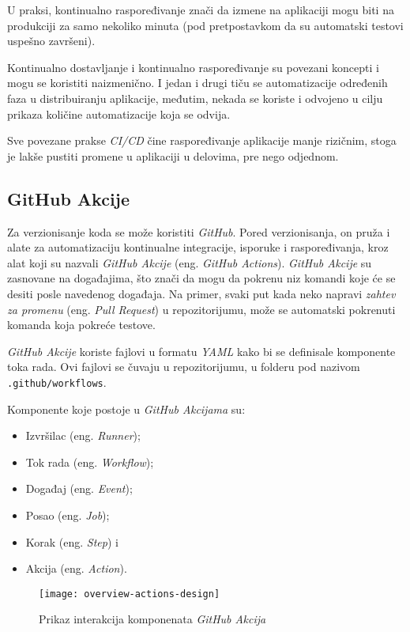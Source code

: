 U praksi, kontinualno raspoređivanje znači da izmene na aplikaciji mogu biti na produkciji za samo 
nekoliko minuta (pod pretpostavkom da su automatski testovi uspešno završeni).

Kontinualno dostavljanje i kontinualno raspoređivanje su povezani koncepti i mogu se koristiti naizmenično. 
I jedan i drugi tiču se automatizacije određenih faza u distribuiranju aplikacije, 
međutim, nekada se koriste i odvojeno u cilju prikaza količine automatizacije koja se odvija.

Sve povezane prakse \textit{CI/CD} čine raspoređivanje aplikacije manje rizičnim, stoga je lakše pustiti 
promene u aplikaciji u delovima, pre nego odjednom.~\cite{CI_CD}

\subsection{GitHub Akcije}
Za verzionisanje koda se može koristiti \textit{GitHub}. Pored verzionisanja, on pruža i alate za automatizaciju 
kontinualne integracije, isporuke i raspoređivanja, kroz alat koji su nazvali \textit{GitHub Akcije} 
(eng. \textit{GitHub Actions}). 
\textit{GitHub Akcije} su zasnovane na događajima, što znači da mogu da pokrenu niz komandi koje će se desiti 
posle navedenog događaja. Na primer, svaki put kada neko napravi \textit{zahtev za promenu} 
(eng. \textit{Pull Request}) u repozitorijumu, može se automatski pokrenuti komanda koja pokreće 
testove. 

\textit{GitHub Akcije} koriste fajlovi u formatu \textit{YAML} kako bi se definisale komponente toka rada. Ovi fajlovi 
se čuvaju u repozitorijumu, u folderu pod nazivom \mbox{\texttt{.github/workflows}}.

Komponente koje postoje u \textit{GitHub Akcijama} su: 

\begin{itemize}
    \item Izvršilac (eng. \textit{Runner});
    \item Tok rada (eng. \textit{Workflow});
    \item Događaj (eng. \textit{Event});
    \item Posao (eng. \textit{Job});
    \item Korak (eng. \textit{Step}) i
    \item Akcija (eng. \textit{Action}).
\end{itemize}

\begin{figure}[h]
    \centering
    \texttt{[image: overview-actions-design]}
    \caption{Prikaz interakcija komponenata \textit{GitHub Akcija}}
\end{figure}

